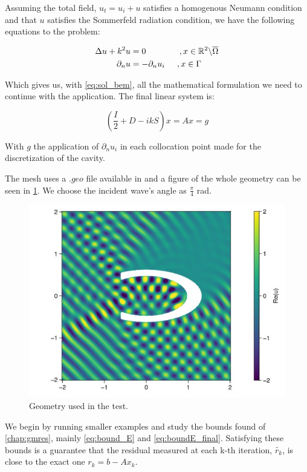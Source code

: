 Assuming the total field, $u_{t} = u_{i} + u $ satisfies a homogenous Neumann condition and that $u$ satisfies the Sommerfeld radiation condition, we have the following equations to the problem:

\begin{align}\label{eq:cavity_pdes}
    \begin{split}
        \Delta u + k^{2}u &= 0\hspace{0.55in}, x \in \mathbb{R}^{2} \backslash \overline{\Omega} \\
        \partial_{n} u &= -\partial_{n}u_{i}\hspace{0.2in}, x \in \Gamma
    \end{split}
\end{align}

Which gives us, with \ref{eq:sol_bem}, all the mathematical formulation we need to continue with the application. The final linear system is:

\begin{equation}
    \left( \frac{I}{2} + D - ikS \right) x = Ax =g
\end{equation}

With $g$ the application of $\partial_{n} u_{i}$ in each collocation point made for the discretization of the cavity.

The mesh uses a $.geo$ file
available in \cite{git_dudu} and a figure of the whole geometry can be seen in \ref{fig:cavity_fig}. We choose the incident wave's angle as $\frac{\pi}{4}$ rad.

\begin{figure}[h!]
    \centering
    \includegraphics[width=0.5\linewidth]{images/cavity_fig.jpg}
    \caption{Geometry used in the test.}
    \label{fig:cavity_fig}
\end{figure}


We begin by running smaller examples and study the bounds found of \autoref{chap:gmres}, mainly \ref{eq:bound_E} and \ref{eq:boundE_final}. Satisfying these bounds is a guarantee that the residual measured at each k-th iteration, $\tilde{r_{k}}$, is close to the exact one $r_{k} =b-Ax_{k}$.

